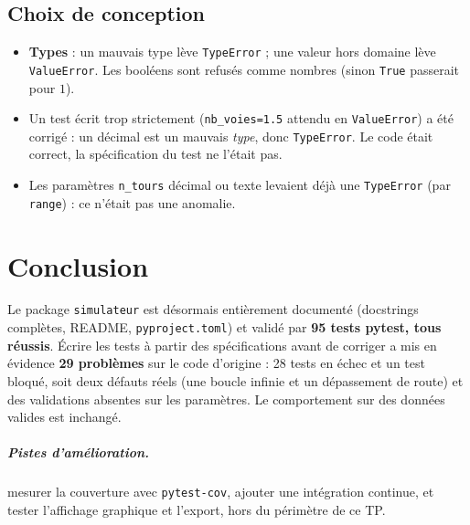 \documentclass[12pt,a4paper]{report}
\begin{document}
\section{Choix de conception}
\begin{itemize}
  \item \textbf{Types} : un mauvais type lève \texttt{TypeError} ; une valeur hors domaine lève \texttt{ValueError}.
        Les booléens sont refusés comme nombres (sinon \texttt{True} passerait pour $1$).
  \item Un test écrit trop strictement (\texttt{nb\_\allowbreak{}voies=1.5} attendu en \texttt{ValueError}) a été corrigé : un
        décimal est un mauvais \emph{type}, donc \texttt{TypeError}. Le code était correct, la spécification du test ne l'était pas.
  \item Les paramètres \texttt{n\_\allowbreak{}tours} décimal ou texte levaient déjà une \texttt{TypeError} (par \texttt{range}) :
        ce n'était pas une anomalie.
\end{itemize}

\chapter*{Conclusion}
Le package \texttt{simulateur} est désormais entièrement documenté (docstrings complètes, README, \texttt{pyproject.toml}) et
validé par \textbf{95 tests pytest, tous réussis}. Écrire les tests à partir des spécifications avant de corriger
a mis en évidence \textbf{29 problèmes} sur le code d'origine : 28 tests en échec et un test bloqué, soit
deux défauts réels (une boucle infinie et un dépassement de route) et des validations absentes sur les
paramètres. Le comportement sur des données valides est inchangé.

\paragraph{Pistes d'amélioration.}
mesurer la couverture avec \texttt{pytest-cov}, ajouter une intégration continue, et tester
l'affichage graphique et l'export, hors du périmètre de ce TP.
\end{document}
